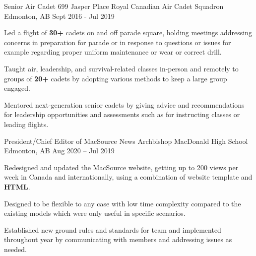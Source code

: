 

\begin{cventries}

  \cventry
    {Senior Air Cadet} %
    {699 Jasper Place Royal Canadian Air Cadet Squadron} %
    {Edmonton, AB} %
    {Sept 2016 - Jul 2019} %
    {
      \begin{cvitems} %
        \item {Led a flight of \textbf{30+} cadets on and off parade square, holding meetings addressing concerns in preparation for parade or in response to questions or issues for example regarding proper uniform maintenance or wear or correct drill.}
        \item {Taught air, leadership, and survival-related classes in-person and remotely to groups of \textbf{20+} cadets by adopting various methods to keep a large group engaged.}
        \item {Mentored next-generation senior cadets by giving advice and recommendations for leadership opportunities and assessments such as for instructing classes or leading flights.}
      \end{cvitems}
    }

  \cventry
    {President/Chief Editor of MacSource News} %
    {Archbishop MacDonald High School} %
    {Edmonton, AB} %
    {Aug 2020 – Jul 2019} %
    {
      \begin{cvitems} %
        \item {Redesigned and updated the MacSource website, getting up to 200 views per week in Canada and internationally, using a combination of website template and \textbf{HTML}.}
        \item {Designed to be flexible to any case with low time complexity compared to the existing models which were only useful in specific scenarios.}
        \item {Established new ground rules and standards for team and implemented throughout year by communicating with members and addressing issues as needed.}
      \end{cvitems}
    }

\end{cventries}
